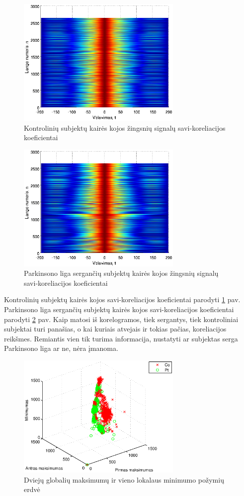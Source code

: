 \documentclass[]{vgtuef}
\begin{document}
\begin{figure}[!t]
  \centering
  \includegraphics[width=300px]{figures/co_corr.eps}
  \caption{Kontrolinių subjektų kairės kojos žingsnių signalų savi-koreliacijos koeficientai}
  \label{fig:co_corr}
\end{figure}

\begin{figure}[!t]
  \centering
  \includegraphics[width=300px]{figures/pt_corr.eps}
  \caption{Parkinsono liga sergančių subjektų kairės kojos žingsnių signalų savi-koreliacijos koeficientai}
  \label{fig:pt_corr}
\end{figure}

Kontrolinių subjektų kairės kojos savi-koreliacijos koeficientai parodyti \ref{fig:co_corr} pav. Parkinsono liga sergančių subjektų kairės kojos savi-koreliacijos koeficientai parodyti \ref{fig:pt_corr} pav. Kaip matosi iš korelogramos, tiek sergantys, tiek kontroliniai subjektai turi panašias, o kai kuriais atvejais ir tokias pačias, koreliacijos reikšmes. Remiantis vien tik turima informacija, nustatyti ar subjektas serga Parkinsono liga ar ne, nėra įmanoma.

\begin{figure}[!t]
  \centering
  \includegraphics[width=300px]{figures/maximums_minimums.eps}
  \caption{Dviejų globalių maksimumų ir vieno lokalaus minimumo požymių erdvė}
  \label{fig:max_min}
\end{figure}
\end{document}
